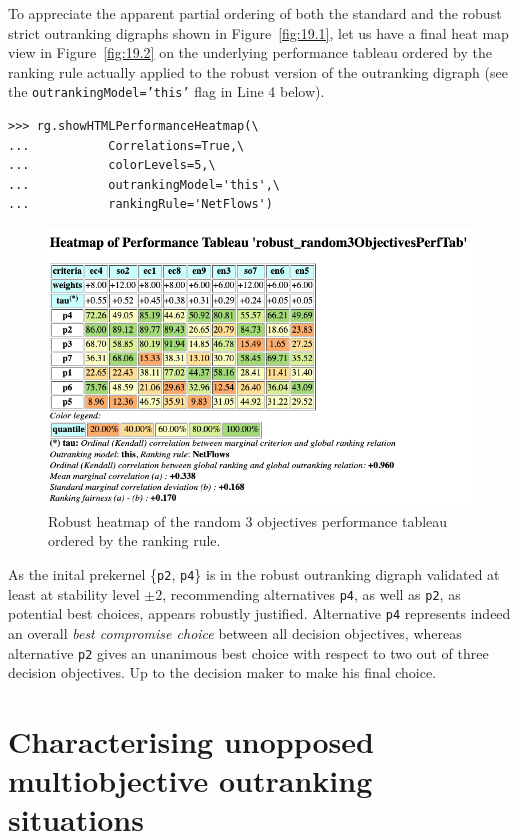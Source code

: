 To appreciate the apparent partial ordering of both the standard and the robust strict outranking digraphs shown in Figure~\vref{fig:19.1}, let us have a final heat map view in Figure~\vref{fig:19.2} on the underlying performance tableau ordered by the \NetFlows ranking rule actually applied to the robust version of the outranking digraph (see the \texttt{outrankingModel='this'} flag in Line 4 below).
\begin{lstlisting}[caption={Computing a robust performance heatmap view},label=list:19.9]
>>> rg.showHTMLPerformanceHeatmap(\
...           Correlations=True,\
...           colorLevels=5,\
...           outrankingModel='this',\
...           rankingRule='NetFlows')
\end{lstlisting}
\begin{figure}[ht]
\includegraphics[width=\hsize]{Figures/19-2-robustHeatmap.png}
\caption{Robust heatmap of the random 3 objectives performance tableau ordered by the \NetFlows ranking rule.} 
\label{fig:19.2}       %
\end{figure}
 As the inital prekernel \{\texttt{p2}, \texttt{p4}\} is in the robust outranking digraph validated at least at stability level $\pm 2$, recommending alternatives \texttt{p4}, as well as \texttt{p2}, as potential best choices, appears robustly justified. Alternative \texttt{p4} represents indeed an overall \emph{best compromise choice} between all decision objectives, whereas alternative \texttt{p2} gives an unanimous best choice with respect to two out of three decision objectives. Up to the decision maker to make his final choice.

\section{Characterising unopposed multiobjective outranking situations}
\label{sec:19.5}

